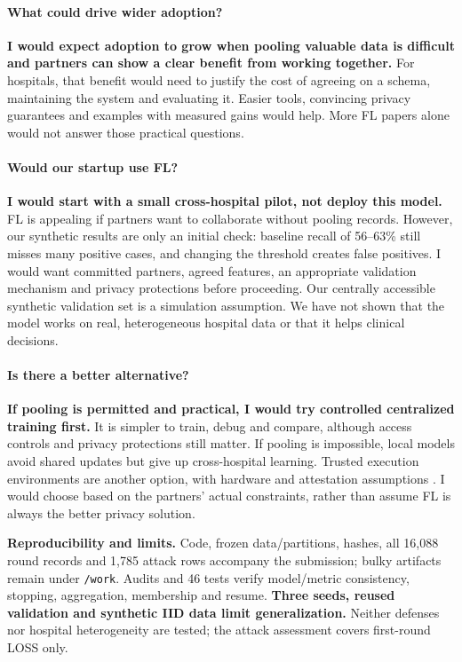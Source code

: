 \documentclass[10pt]{article}
\begin{document}
\paragraph{What could drive wider adoption?}
\textbf{I would expect adoption to grow when pooling valuable data is difficult
and partners can show a clear benefit from working together.} For hospitals,
that benefit would need to justify the cost of agreeing on a schema, maintaining
the system and evaluating it. Easier tools, convincing privacy guarantees and
examples with measured gains would help. More FL papers alone would not answer
those practical questions.

\paragraph{Would our startup use FL?}
\textbf{I would start with a small cross-hospital pilot, not deploy this model.}
FL is appealing if partners want to collaborate without pooling records.
However, our synthetic results are only an initial check: baseline recall of
56--63\% still misses many positive cases, and changing the threshold creates
false positives. I would want committed partners, agreed features, an appropriate
validation mechanism and privacy protections before proceeding. Our centrally
accessible synthetic validation set is a simulation assumption. We have not
shown that the model works on real, heterogeneous hospital data or that it helps
clinical decisions.

\paragraph{Is there a better alternative?}
\textbf{If pooling is permitted and practical, I would try controlled centralized
training first.} It is simpler to train, debug and compare, although access
controls and privacy protections still matter. If pooling is impossible, local
models avoid shared updates but give up cross-hospital learning. Trusted execution
environments are another option, with hardware and attestation assumptions
\cite{survey,parfait}. I would choose based on the partners' actual constraints,
rather than assume FL is always the better privacy solution.

\textbf{Reproducibility and limits.}
Code, frozen data/partitions, hashes, all 16,088 round records and 1,785 attack
rows accompany the submission; bulky artifacts remain under \texttt{/work}.
Audits and 46 tests verify model/metric consistency, stopping, aggregation,
membership and resume. \textbf{Three seeds, reused validation and synthetic IID
data limit generalization.} Neither defenses nor hospital heterogeneity are
tested; the attack assessment covers first-round LOSS only.
\end{document}
